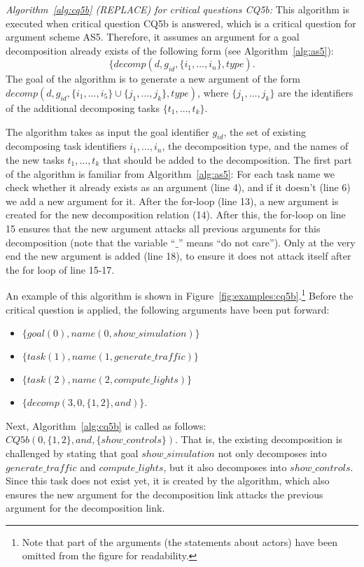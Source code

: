 \emph{Algorithm~\ref{alg:cq5b} (\textsf{REPLACE}) for critical questions CQ5b:} This algorithm is executed when critical question CQ5b is answered, which is a critical question for argument scheme AS5. Therefore, it assumes an argument for a goal decomposition already exists of the following form (see Algorithm~\ref{alg:as5}): $$\{decomp(d, g_{id}, \{i_1,\ldots,i_n\},type).$$  The goal of the algorithm is to generate a new argument of the form $decomp(d, g_{id}, \{i_1,\ldots,i_5\}\cup \{j_1,\ldots,j_k\}, type)$, where $\{j_1,\ldots,j_k\}$ are the identifiers of the additional decomposing tasks $\{t_1,\ldots,t_k\}$.

The algorithm takes as input the goal identifier $g_{id}$, the set of existing decomposing task identifiers $i_1,\ldots,i_n$, the decomposition type, and the names of the new tasks $t_1,\ldots,t_k$ that should be added to the decomposition. The first part of the algorithm is familiar from Algorithm~\ref{alg:as5}: For each task name we check whether it already exists as an argument (line 4), and if it doesn't (line 6) we add a new argument for it. After the for-loop (line 13), a new argument is created for the new decomposition relation (14). After this, the for-loop on line 15 ensures that the new argument attacks all previous arguments for this decomposition (note that the variable ``$\_$'' means ``do not care''). Only at the very end the new argument is added (line 18), to ensure it does not attack itself after the for loop of line 15-17. 

An example of this algorithm is shown in Figure~\ref{fig:examples:cq5b}.\footnote{Note that part of the arguments (the statements about actors) have been omitted from the figure for readability.} Before the critical question is applied, the following arguments have been put forward:
\begin{itemize}
\item $\{goal(0),name(0,show\_simulation)\}$
\item $\{task(1),name(1,generate\_traffic)\}$
\item $\{task(2),name(2,compute\_lights)\}$
\item $\{decomp(3,0,\{1,2\},and)\}$.
\end{itemize}

Next, Algorithm~\ref{alg:cq5b} is called as follows: $CQ5b(0,\{1,2\},and,\{show\_controls\})$. That is, the existing decomposition is challenged by stating that goal $show\_simulation$ not only decomposes into $generate\_traffic$ and $compute\_lights$, but it also decomposes into $show\_controls$. Since this task does not exist yet, it is created by the algorithm, which also ensures the new argument for the decomposition link attacks the previous argument for the decomposition link.

